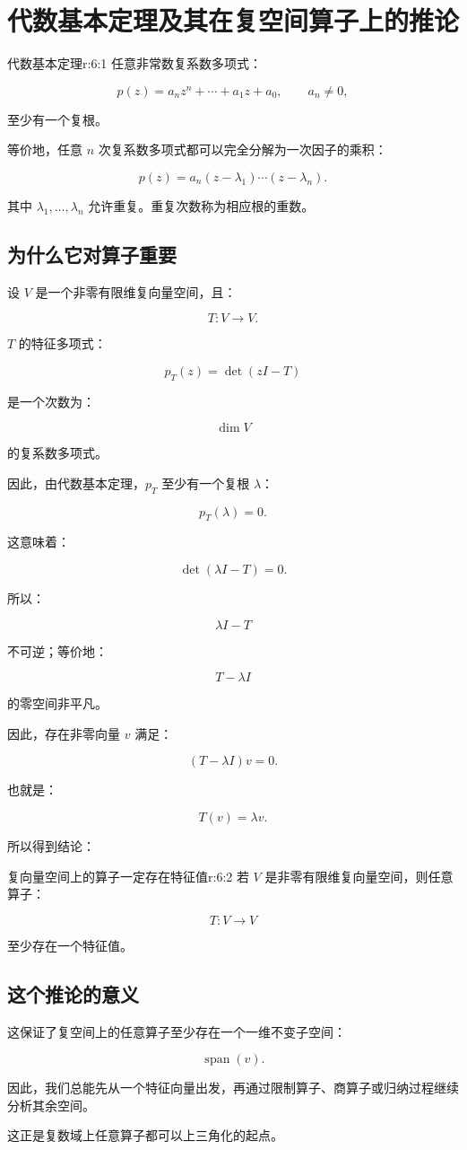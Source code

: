 
\chapter{代数基本定理及其在复空间算子上的推论}


\begin{jthm}{代数基本定理}{r:6:1}
任意非常数复系数多项式：

\[
p(z)=a_nz^n+\cdots+a_1z+a_0,
\qquad
a_n\ne0,
\]

至少有一个复根。

等价地，任意 $n$ 次复系数多项式都可以完全分解为一次因子的乘积：

\[
p(z)
=
a_n(z-\lambda_1)\cdots(z-\lambda_n).
\]

其中 $\lambda_1,\ldots,\lambda_n$ 允许重复。重复次数称为相应根的重数。
\end{jthm}

\section{为什么它对算子重要}

设 $V$ 是一个非零有限维复向量空间，且：

\[
T:V\to V.
\]

$T$ 的特征多项式：

\[
p_T(z)=\det(zI-T)
\]

是一个次数为：

\[
\dim V
\]

的复系数多项式。

因此，由代数基本定理，$p_T$ 至少有一个复根 $\lambda$：

\[
p_T(\lambda)=0.
\]

这意味着：

\[
\det(\lambda I-T)=0.
\]

所以：

\[
\lambda I-T
\]

不可逆；等价地：

\[
T-\lambda I
\]

的零空间非平凡。

因此，存在非零向量 $v$ 满足：

\[
(T-\lambda I)v=0.
\]

也就是：

\[
T(v)=\lambda v.
\]

所以得到结论：

\begin{jthm}{复向量空间上的算子一定存在特征值}{r:6:2}
若 $V$ 是非零有限维复向量空间，则任意算子：

\[
T:V\to V
\]

至少存在一个特征值。
\end{jthm}

\section{这个推论的意义}

这保证了复空间上的任意算子至少存在一个一维不变子空间：

\[
\operatorname{span}(v).
\]

因此，我们总能先从一个特征向量出发，再通过限制算子、商算子或归纳过程继续分析其余空间。

这正是复数域上任意算子都可以上三角化的起点。
